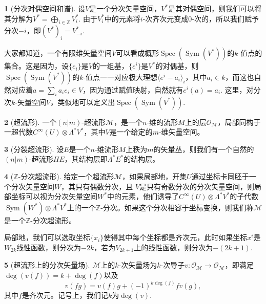 \documentclass[11pt]{article}
\theoremstyle{definition}
\newtheorem{para}{}[section]
\theoremstyle{plain}
\begin{document}
\begin{para}[分次对偶空间和谱]
    设$V$是一个分次矢量空间，$V^*$是其对偶空间，则我们可以将其分解为$V^*=\bigoplus_{i\in\mathbb Z}V_i^*$. 由于$V_i^*$中的元素将$i$-次齐次元变成$0$-次的，所以我们赋予分次$-i$，即$(V^*)_i=V_{-i}^*$.

    大家都知道，一个有限维矢量空间$V$可以看成概形$\operatorname{Spec}(\operatorname{Sym}(V^*))$的$k$-值点的集合。这是因为，设$\{e_i\}$是$V$的一组基，$\{e^i\}$是$V^*$的对偶基，则$\operatorname{Spec}(\operatorname{Sym}(V^*))$的$k$-值点一一对应极大理想$\langle e^i-a_i\rangle_i$，其中$a_i\in k$，而这也自然对应着$a=\sum_i a_ie_i\in V$，因为通过赋值映射，自然就有$e^i(a)=a_i$.
    这里，对分次$k$-矢量空间$V$，类似地可以定义出$\operatorname{Spec}(\operatorname{Sym}(V^*))$.
\end{para}

\begin{para}[超流形]
一个$(n|m)$-超流形$\mathcal M$，是一个$n$-维的流形$M$上的层$\mathcal O_{\mathcal M}$，局部同构于一超代数$C^\infty(U)\otimes \Lambda^* V^*$，其中$V$是一个给定的$m$-维矢量空间。
\end{para}

\begin{para}[分裂超流形]
设$E$是一个$n$-维流形$M$上秩为$m$的矢量丛，则我们有一个自然的$(n|m)$-超流形$\Pi E$，其结构层即$\Lambda^* E^*$的结构层。
\end{para}

\begin{para}[$\mathbb Z$-分次超流形]
给定一个超流形$\mathcal M$，如果局部地，开集$U$通过坐标卡同胚于一个分次矢量空间$W$，其只有偶数分次，且
$V$是只有奇数分次的分次矢量空间，则局部坐标可以视为分次矢量空间$W^*$中的元素，他们诱导了$C^\infty(U)\otimes \Lambda^* V^*$的子代数$\operatorname{Sym}(W^*)\otimes \Lambda^* V^*$上的一个$\mathbb Z$-分次。如果这个分次相容于坐标变换，则我们称$\mathcal M$是一个$\mathbb Z$-分次超流形。
\end{para}

局部地，我们可以选取坐标$\{x_i\}$使得其中每个坐标都是齐次元，此时如果坐标$x^i$是$W_{2k}$线性函数，则分次为$-2k$，若为$V_{2k+1}$上的线性函数，则分次为$-(2k+1)$.

\begin{para}[超流形上的分次矢量场]
    $\mathcal M$上的$k$-次矢量场为$k$-次导子$v:\mathcal O_{\mathcal M}\to \mathcal O_{\mathcal M}$，即满足$\deg (v(f))=k+\deg(f)$以及
    \[
        v(fg)=v(f)g+(-1)^{k\deg(f)}fv(g),
    \]
    其中$f$是齐次元。记号上，我们记$k$为$\deg(v)$.
\end{para}
\end{document}
